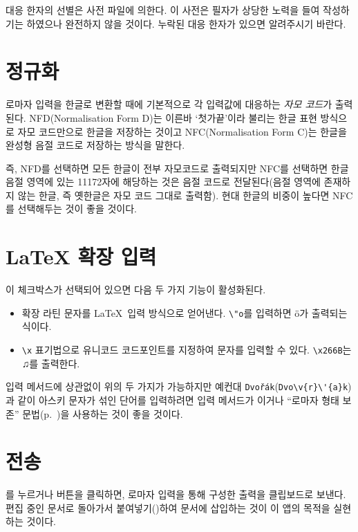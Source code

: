 \documentclass{simplman}
\let\opt\stopt
\let\file\path
\newcommand*\guielem[1]{\colorbox{blue8!20}{\sffamily[#1]}}
\begin{document}
대응 한자의 선별은 \file{*.json} 사전 파일에 의한다. 이 사전은 필자가 상당한 노력을
들여 작성하기는 하였으나 완전하지 않을 것이다. 누락된 대응 한자가 있으면 알려주시기 바란다.


\section{정규화}

로마자 입력을 한글로 변환할 때에 기본적으로 각 입력값에 대응하는 \emph{자모 코드}가 출력된다.
NFD(Normalisation Form D)는 이른바 `첫가끝'이라 불리는 한글 표현 방식으로 자모 코드만으로
한글을 저장하는 것이고 NFC(Normalisation Form C)는 한글을 완성형 음절 코드로 저장하는 방식을 말한다.

즉, NFD를 선택하면 모든 한글이 전부 자모코드로 출력되지만 NFC를 선택하면 한글 음절 영역에 있는 11172자에 해당하는 것은 음절 코드로 전달된다(음절 영역에 존재하지 않는 한글, 즉 옛한글은 자모 코드 그대로 출력함).
현대 한글의 비중이 높다면 NFC를 선택해두는 것이 좋을 것이다.

\section{\LaTeX{} 확장 입력}

이 체크박스가 선택되어 있으면 다음 두 가지 기능이 활성화된다.
\begin{itemize} \oblivoirlist
\item 확장 라틴 문자를 \LaTeX\ 입력 방식으로 얻어낸다. \verb|\"o|를 입력하면 \"o가 출력되는 식이다.
\item \verb|\x| 표기법으로 유니코드 코드포인트를 지정하여 문자를 입력할 수 있다. \verb|\x266B|는 ♫를 출력한다.
\end{itemize}

입력 메서드에 상관없이 위의 두 가지가 가능하지만 예컨대 \texttt{Dvořák}(\verb|Dvo\v{r}\'{a}k|)과 같이 아스키 문자가 섞인 
단어를 입력하려면 입력 메서드가 \opt{transparent}이거나 ``로마자 형태 보존'' 문법(p.~\pageref{sec:iden})을 사용하는 것이 좋을 것이다. 


\section{전송}

를 누르거나 \guielem{전송} 버튼을 클릭하면, 
로마자 입력을 통해 구성한 출력을 클립보드로 보낸다. 편집 중인 문서로 돌아가서 붙여넣기()하여 문서에 삽입하는 것이 이 앱의 목적을 실현하는 것이다.
\end{document}
